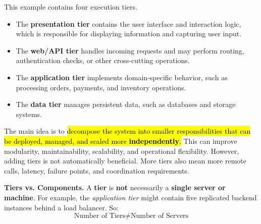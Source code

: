 \begin{examplebox}
    This example contains four execution tiers.
    \begin{itemize}
        \item The \textbf{presentation tier} contains the user interface and interaction logic, which is responsible for displaying information and capturing user input.
        \item The \textbf{web/API tier} handles incoming requests and may perform routing, authentication checks, or other cross-cutting operations.
        \item The \textbf{application tier} implements domain-specific behavior, such as processing orders, payments, and inventory operations.
        \item The \textbf{data tier} manages persistent data, such as databases and storage systems.
    \end{itemize}
    The main idea is to \hl{decompose the system into smaller responsibilities that can be deployed, managed, and scaled more \textbf{independently}.} This can improve modularity, maintainability, scalability, and operational flexibility. However, adding tiers is not automatically beneficial. More tiers also mean more remote calls, latency, failure points, and coordination requirements.
\end{examplebox}

\highspace
\textcolor{DarkOrange3}{ \textbf{Tiers vs. Components.}} A \textbf{tier} is \textbf{not} necessarily a \textbf{single server or machine}. For example, the \emph{application tier} might contain five replicated backend instances behind a load balancer. So:
\begin{equation*}
    \text{Number of Tiers} \neq \text{Number of Servers}
\end{equation*}

